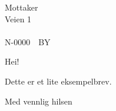 \documentclass[a4paper,norsk]{brev}
\begin{document}
\address{Veien 133\\\ \\9999\ \ LANGTVEKKISTAN}


\begin{letter}{Mottaker\\
               Veien 1\\
               \ \\
               N-0000\ \ BY}
  
\opening{Hei!}

Dette er et lite eksempelbrev.

\closing{Med vennlig hilsen}

\end{letter}
\end{document}
